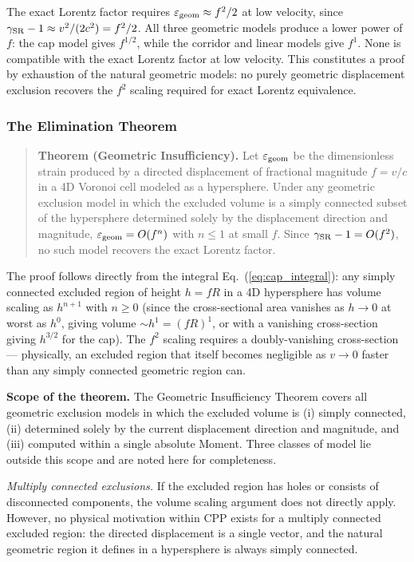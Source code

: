 \documentclass[11pt,letterpaper]{article}
\begin{document}
The exact Lorentz factor requires $\varepsilon_{\rm geom} \approx f^2/2$ at low velocity, since $\gamma_{\rm SR} - 1 \approx v^2/(2c^2) = f^2/2$. 
All three geometric models produce a lower power of $f$: the cap model gives $f^{1/2}$, while the corridor and linear models give $f^1$. None is compatible with the exact Lorentz factor at low velocity. This constitutes a proof by exhaustion of the natural geometric models: no purely geometric displacement exclusion recovers the $f^2$ scaling 
required for exact Lorentz equivalence.

\subsubsection{The Elimination Theorem}

\begin{quote}
\textbf{Theorem (Geometric Insufficiency).} Let $\varepsilon_{\rm geom}$ be the dimensionless strain produced by a directed displacement of fractional magnitude $f = v/c$ in a 4D Voronoi cell modeled as a hypersphere. Under any geometric exclusion model in which the excluded volume is a simply connected subset of the hypersphere determined solely 
by the displacement direction and magnitude, $\varepsilon_{\rm geom} = O(f^n)$ with $n \leq 1$ at small $f$. Since $\gamma_{\rm SR} - 1 = O(f^2)$, no such model recovers the exact Lorentz factor.
\end{quote}

The proof follows directly from the integral Eq.~(\ref{eq:cap_integral}): any simply connected excluded region of height $h = fR$ in a 4D hypersphere has volume scaling as $h^{n+1}$ with $n \geq 0$ (since the cross-sectional area vanishes as $h \to 0$ at worst as $h^0$, giving volume $\sim h^1 = (fR)^1$, or with a vanishing cross-section giving $h^{3/2}$ for the cap). The $f^2$ scaling requires a doubly-vanishing cross-section — physically, an excluded region that itself becomes negligible as $v \to 0$ faster than any simply connected geometric region can.

\textbf{Scope of the theorem.} The Geometric Insufficiency Theorem covers all geometric exclusion models in which the excluded volume is 
(i) simply connected, (ii) determined solely by the current displacement direction and magnitude, and (iii) computed within a 
single absolute Moment. Three classes of model lie outside this scope and are noted here for completeness.

\textit{Multiply connected exclusions.} If the excluded region has holes or consists of disconnected components, the volume scaling 
argument does not directly apply. However, no physical motivation within CPP exists for a multiply connected excluded region: the 
directed displacement is a single vector, and the natural geometric region it defines in a hypersphere is always simply connected.
\end{document}
